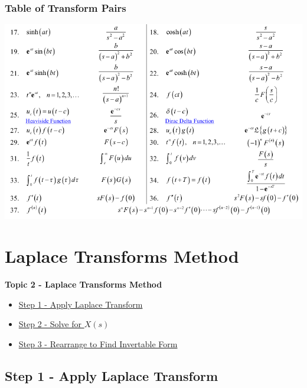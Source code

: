 \documentclass[fleqn]{beamer} %
\newcommand{\sectionIItitle}{Laplace Transforms Method}
\newcommand{\sectionIsubsectionIVtitle}{Table of Transform Pairs}
\newcommand{\sectionIIsubsectionItitle}{Step 1 - Apply Laplace Transform}
\newcommand{\sectionIIsubsectionIItitle}{Step 2 - Solve for $X(s)$}
\newcommand{\sectionIIsubsectionIIItitle}{Step 3 - Rearrange to Find Invertable Form}
\newcommand{\sectionIIsubsectionIVtitle}{Step 4 - Invert for Final Answer}
\begin{document}
			\begin{frame}
				\frametitle{\sectionIsubsectionIVtitle}
				\bigskip

				\includegraphics[scale=.35]{images/laplace_table_part2.png}

				\btVFill
			\end{frame}	

	
	\section{\sectionIItitle}\label{sectionII}

		\begin{frame}
			\large \textbf{Topic 2 - \sectionIItitle} \vspace{3mm}\\

			\begin{itemize}
				\item \hyperlink{sectionIIsubsectionI}{\sectionIIsubsectionItitle} \vspc %
				\item \hyperlink{sectionIIsubsectionII}{\sectionIIsubsectionIItitle} \vspc %
				\item \hyperlink{sectionIIsubsectionIII}{\sectionIIsubsectionIIItitle} \vspc %
			\end{itemize}

		\end{frame}

		\subsection{\sectionIIsubsectionItitle}\label{sectionIIsubsectionI}
\end{document}

